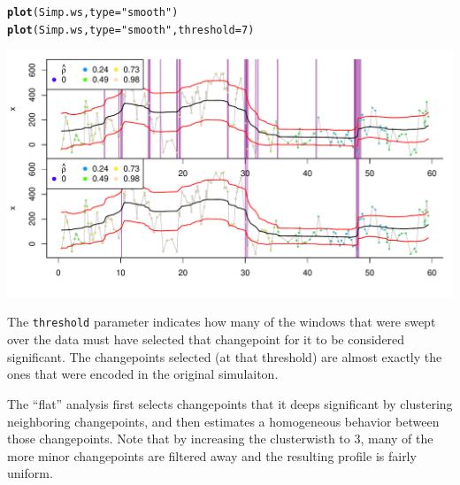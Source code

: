 \documentclass[10pt]{article}\usepackage[]{graphicx}\usepackage[]{color}
\makeatletter
\newcommand{\hlnum}[1]{\textcolor[rgb]{0.686,0.059,0.569}{#1}}%
\newcommand{\hlstr}[1]{\textcolor[rgb]{0.192,0.494,0.8}{#1}}%
\newcommand{\hlstd}[1]{\textcolor[rgb]{0.345,0.345,0.345}{#1}}%
\newcommand{\hlkwc}[1]{\textcolor[rgb]{0.333,0.667,0.333}{#1}}%
\newcommand{\hlkwd}[1]{\textcolor[rgb]{0.737,0.353,0.396}{\textbf{#1}}}%
\newenvironment{kframe}{%
 \def\at@end@of@kframe{}%
 \ifinner\ifhmode%
  \def\at@end@of@kframe{\end{minipage}}%
  \begin{minipage}{\columnwidth}%
 \fi\fi%
 \def\FrameCommand##1{\hskip\@totalleftmargin \hskip-\fboxsep
 \colorbox{shadecolor}{##1}\hskip-\fboxsep
     \hskip-\linewidth \hskip-\@totalleftmargin \hskip\columnwidth}%
 \MakeFramed {\advance\hsize-\width
   \@totalleftmargin\z@ \linewidth\hsize
   \@setminipage}}%
 {\par\unskip\endMakeFramed%
 \at@end@of@kframe}
\newenvironment{knitrout}{}{} %
\makeatother
\begin{document}
\begin{knitrout}\small
{}\color{fgcolor}\begin{kframe}
\begin{alltt}
\hlkwd{plot}\hlstd{(Simp.ws,} \hlkwc{type} \hlstd{=} \hlstr{"smooth"}\hlstd{)}
\hlkwd{plot}\hlstd{(Simp.ws,} \hlkwc{type} \hlstd{=} \hlstr{"smooth"}\hlstd{,} \hlkwc{threshold} \hlstd{=} \hlnum{7}\hlstd{)}
\end{alltt}
\end{kframe}
\includegraphics[width=\textwidth]{figure/BCPAsmooth} 

\end{knitrout}



The \texttt{threshold} parameter indicates how many of the windows that were swept over the data must have selected that changepoint for it to be considered significant.  The changepoints selected (at that threshold) are almost exactly the ones that were encoded in the original simulaiton. 

The ``flat'' analysis first selects changepoints that it deeps significant by clustering neighboring changepoints, and then estimates a homogeneous behavior between those changepoints.  Note that by increasing the clusterwisth to 3, many of the more minor changepoints are filtered away and the resulting profile is fairly uniform.
\end{document}
